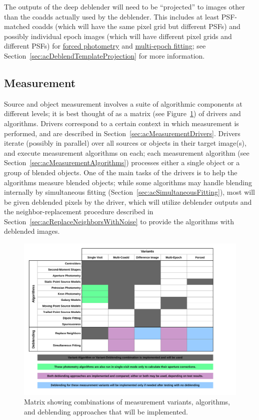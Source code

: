 The outputs of the deep deblender will need to be ``projected'' to images other than the coadds actually used by the deblender.  This includes at least PSF-matched coadds (which will have the same pixel grid but different PSFs) and possibly individual epoch images (which will have different pixel grids and different PSFs) for \hyperref[sec:drpForcedPhotometry]{forced photometry} and \hyperref[sec:drpMultiFit]{multi-epoch fitting}; see Section~\ref{sec:acDeblendTemplateProjection} for more information.

\subsection{Measurement}
\label{sec:acMeasurement}

Source and object measurement involves a suite of algorithmic components at different levels; it is best thought of as a matrix (see Figure~\ref{fig:measurement-matrix}) of drivers and algorithms.  Drivers correspond to a certain context in which measurement is performed, and are described in Section~\ref{sec:acMeasurementDrivers}.  Drivers iterate (possibly in parallel) over all sources or objects in their target image(s), and execute measurement algorithms on each; each measurement algorithm (see Section~\ref{sec:acMeasurementAlgorithms}) processes either a single object or a group of blended objects.  One of the main tasks of the drivers is to help the algorithms measure blended objects; while some algorithms may handle blending internally by simultaneous fitting (Section~\ref{sec:acSimultaneousFitting}), most will be given deblended pixels by the driver, which will utilize deblender outputs and the neighbor-replacement procedure described in Section~\ref{sec:acReplaceNeighborsWithNoise} to provide the algorithms with deblended images.

\begin{figure}
\centering
\includegraphics[width=\textwidth]{figures/measurement-matrix.pdf}
\caption{Matrix showing combinations of measurement variants, algorithms, and deblending approaches that will be implemented.
\label{fig:measurement-matrix}}
\end{figure}


